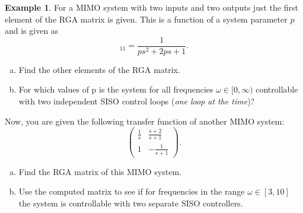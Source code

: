 \documentclass[a4paper,12 pt]{article}
\numberwithin{equation}{section}
\theoremstyle{definition}
\newtheorem{bsp}{Example}
\theoremstyle{remark}
\theoremstyle{definition}
\theoremstyle{definition}
\theoremstyle{definition}
\theoremstyle{remark}
\begin{document}
\newpage
\begin{bsp}
For a MIMO system with two inputs and two outputs just the first element of the RGA matrix is given. This is a function of a system parameter $p$ and is given as
\begin{equation*}
[\text{RGA}(s)]_{11}=\frac{1}{ps^2+2ps+1}.
\end{equation*}
\begin{enumerate}[(a)]
\item Find the other elements of the RGA matrix.
\item For which values of p is the system for all frequencies $\omega \in [0,\infty)$ controllable with two independent SISO control loops (\textit{one loop at the time})?
\end{enumerate}
Now, you are given the following transfer function of another MIMO system:
\begin{equation*}
\begin{pmatrix}
\frac{1}{s}&\frac{s+2}{s+1}\\
1&-\frac{1}{s+1}
\end{pmatrix}.
\end{equation*}
\begin{enumerate}[(c)]
\item Find the RGA matrix of this MIMO system.
\item Use the computed matrix to see if for frequencies in the range $\omega \in [3,10]$  the system is controllable with two separate SISO controllers.
\end{enumerate}


\end{bsp}
\end{document}
